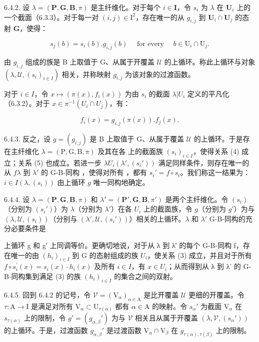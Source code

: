6.4.2. 设 \(\lambda = (\mathbf{P},\mathbf{G},\mathbf{B},\pi)\) 是主纤维化。对于每个 \(i\in \mathbf{I}\)，令 \(s_i\) 为 \(\lambda\) 在 \(\mathbf{U}_i\) 上的一个截面（6.3.3）。对于每一对 \((i,j)\in \mathrm{I}^2\)，存在唯一的从 \(g_{i,j}\) 到 \(\mathbf{U}_i\cap \mathbf{U}_j\) 的态射 \(\mathbf{G}\)，使得：

\[
s _ {j} (b) = s _ {i} (b). g _ {i, j} (b) \quad \text { for   every } \quad b \in \mathrm{U} _ {i} \cap \mathrm{U} _ {j}.\tag{4}
\]

由 \(g_{i,j}\) 组成的族是 B 上取值于 G、从属于开覆盖 \(\mathcal{U}\) 的上循环。称此上循环与对象 \((\lambda, \mathcal{U}, (s_i)_{i \in I})\) 相关，并称映射 \(g_{i,j}\) 为该对象的过渡函数。

对于 \(i \in I\)，令 \(x \mapsto (\pi(x), f_i(x))\) 为由 \(s_i\) 的截面 \(\lambda |U_i\) 定义的平凡化（6.3.2）。对于 \(x \in \pi^{-1}(U_i \cap U_j)\)，有：

\[
f _ {i} (x) = g _ {i, j} (\pi (x)). f _ {j} (x).\tag{5}
\]

6.4.3. 反之，设 \(g = (g_{i,j})\) 是 B 上取值于 G、从属于覆盖 \(\mathcal{U}\) 的上循环。于是存在主纤维化 \(\lambda = (\mathrm{P},\mathrm{G},\mathrm{B},\pi)\) 及其在各  上的截面族 \((s_i)_{i\in I}\)，使得关系 (4) 成立；关系 (5) 也成立。若进一步 \(\lambda\)\(U_i\)\((\lambda',(s_i'))\) 满足同样条件，则存在唯一的从 \(f\)\(\lambda\) 到 \(\lambda'\) 的 G-B-同构 ，使得对所有 ，都有 \(s_i' = f\circ s_i\)。我们称这一结果为：\(i\in I\)\((\lambda,(s_i))\) 由上循环 \(g\) 唯一同构地确定。

6.4.4. 设 \(\lambda = (\mathbf{P}, \mathbf{G}, \mathbf{B}, \pi)\) 和 \(\lambda' = (\mathbf{P}', \mathbf{G}, \mathbf{B}, \pi')\) 是两个主纤维化。令 \((s_i)\)（分别为 \((s_i')\)）为 \(\lambda\)（分别为 \(\lambda'\)）在各 \(U_i\) 上的截面族，令 \(g\)（分别为 \(g'\)）为与 \((\lambda, \mathcal{U}, (s_i))\)（分别与 \((\lambda', \mathcal{U}, (s_i'))\)）相关的上循环。\(\lambda\) 和 \(\lambda'\) G-B-同构的充分必要条件是

上循环 g 和 g′ 上同调等价。更确切地说，对于从 λ 到 λ′ 的每个 G-B-同构 f，存在唯一的由 \((h_{i})_{i\in I}\) 到 G 的态射组成的族 \(U_{i}\)，使关系 (3) 成立，并且对于所有 \(f\circ s_{i}^{\prime}(x)=s_{i}(x) \cdot h_{i}(x)\) 及所有 \(i\in I\)，有 \(x\in U_{i}\)；从而得到从 λ 到 λ' 的 G-B-同构集到满足 (3) 的族 \((h_{i})_{i\in I}\) 的集合之间的双射。

6.4.5. 回到 6.4.2 的记号，令 \(\mathcal{V} = (\mathrm{V}_{\alpha})_{\alpha \in \mathrm{A}}\) 是比开覆盖 \(\mathcal{U}\) 更细的开覆盖。令 \(\tau : \mathrm{A} \to \mathrm{I}\) 是满足对所有 \(\mathrm{V}_{\alpha} \subset \mathrm{U}_{\tau(\alpha)}\) 都有 \(\alpha \in \mathrm{A}\) 的映射。令 \(s_{\alpha}'\) 为截面 \(\mathrm{V}_{\alpha}\) 在 \(s_{\tau(\alpha)}\) 上的限制，令 \(g' = (g_{\alpha,\beta}')\) 为与 \(\mathcal{V}\) 相关且从属于开覆盖 \((\lambda, \mathcal{V}, (s_{\alpha}'))\) 的上循环。于是，过渡函数 \(g_{\alpha,\beta}'\) 是过渡函数 \(\mathrm{V}_{\alpha} \cap \mathrm{V}_{\beta}\) 在 \(g_{\tau(\alpha),\tau(\beta)}\) 上的限制。

